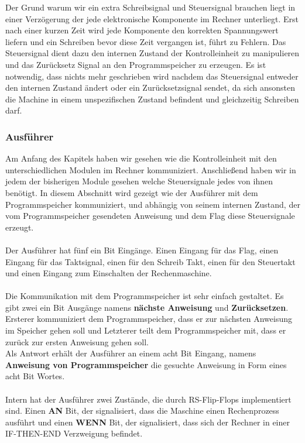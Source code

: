 \documentclass[11pt,a4paper,leqno]{report}
\numberwithin{equation}{chapter}
\begin{document}
\noindent
Der Grund warum wir ein extra Schreibsignal und Steuersignal brauchen liegt in einer Verz\"ogerung der jede elektronische Komponente im Rechner unterliegt. Erst nach einer kurzen Zeit wird jede Komponente den korrekten Spannungswert liefern und ein Schreiben bevor diese Zeit vergangen ist, f\"uhrt zu Fehlern. Das Steuersignal dient dazu den internen Zustand der Kontrolleinheit zu manipulieren und das Zur\"ucksetz Signal an den Programmspeicher zu erzeugen. Es ist notwendig, dass nichts mehr geschrieben wird nachdem das Steuersignal entweder den internen Zustand \"andert oder ein Zur\"ucksetzsignal sendet, da sich ansonsten die Machine in einem unspezifischen Zustand befindent und gleichzeitig Schreiben darf. 
\subsubsection{Ausf\"uhrer}
Am Anfang des Kapitels haben wir gesehen wie die Kontrolleinheit mit den unterschiedlichen Modulen im Rechner kommuniziert. Anschlie\ss{}end haben wir in jedem der bisherigen Module gesehen welche Steuersignale jedes von ihnen ben\"otigt. In diesem Abschnitt wird gezeigt wie der Ausf\"uhrer mit dem Programmspeicher kommuniziert, und abh\"angig von seinem internen Zustand, der vom Programmspeicher gesendeten Anweisung und dem Flag diese Steuersignale erzeugt. 
\\
\\
Der Ausf\"uhrer hat f\"unf ein Bit Eing\"ange. Einen Eingang f\"ur das Flag, einen Eingang f\"ur das Taktsignal, einen f\"ur den Schreib Takt, einen f\"ur den Steuertakt und einen Eingang zum Einschalten der Rechenmaschine.\\
\\
Die Kommunikation mit dem Programmspeicher ist sehr einfach gestaltet. Es gibt zwei ein Bit Ausg\"ange namens \textbf{n\"achste Anweisung} und \textbf{Zur\"ucksetzen}. Ersterer kommuniziert dem Programmspeicher, dass er zur n\"achsten Anweisung im Speicher gehen soll und Letzterer teilt dem Programmspeicher mit, dass er zur\"uck zur ersten Anweisung gehen soll.\\
Als Antwort erh\"alt der Ausf\"uhrer an einem acht Bit Eingang, namens \textbf{Anweisung von Programmspeicher} die gesuchte Anweisung in Form eines acht Bit Wortes.\\
\\
Intern hat der Ausf\"uhrer zwei Zust\"ande, die durch RS-Flip-Flops implementiert sind. Einen \textbf{AN} Bit, der signalisiert, dass die Maschine einen Rechenprozess ausf\"uhrt und einen \textbf{WENN} Bit, der signalisiert, dass sich der Rechner in einer IF-THEN-END Verzweigung befindet.\\
\end{document}
